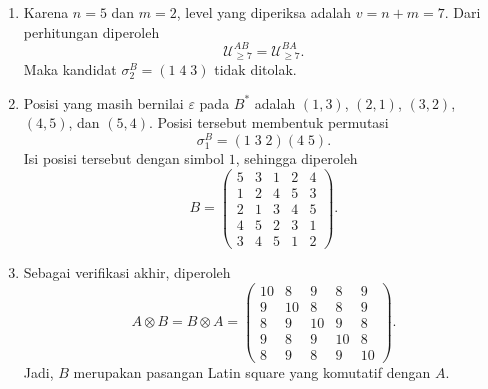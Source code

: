 \begin{contoh}
\begin{enumerate}
    \item Karena $n=5$ dan $m=2$, level yang diperiksa adalah $v=n+m=7$.
          Dari perhitungan diperoleh
          \[
            \mathcal{U}_{\ge 7}^{AB}
            =
            \mathcal{U}_{\ge 7}^{BA}.
          \]
          Maka kandidat $\sigma_2^B=(1\;4\;3)$ tidak ditolak.

    \item Posisi yang masih bernilai $\varepsilon$ pada $B^*$ adalah
          $(1,3)$, $(2,1)$, $(3,2)$, $(4,5)$, dan $(5,4)$.
          Posisi tersebut membentuk permutasi
          \[
            \sigma_1^B=(1\;3\;2)(4\;5).
          \]
          Isi posisi tersebut dengan simbol $1$, sehingga diperoleh
          \[
            B=
            \begin{pmatrix}
              5 & 3 & 1 & 2 & 4 \\
              1 & 2 & 4 & 5 & 3 \\
              2 & 1 & 3 & 4 & 5 \\
              4 & 5 & 2 & 3 & 1 \\
              3 & 4 & 5 & 1 & 2
            \end{pmatrix}.
          \]

    \item Sebagai verifikasi akhir, diperoleh
          \[
            A\otimes B
            =
            B\otimes A
            =
            \begin{pmatrix}
              10 & 8  & 9  & 8  & 9  \\
              9  & 10 & 8  & 8  & 9  \\
              8  & 9  & 10 & 9  & 8  \\
              9  & 8  & 9  & 10 & 8  \\
              8  & 9  & 8  & 9  & 10
            \end{pmatrix}.
          \]
          Jadi, $B$ merupakan pasangan Latin square yang komutatif dengan $A$.
  \end{enumerate}
\end{contoh}